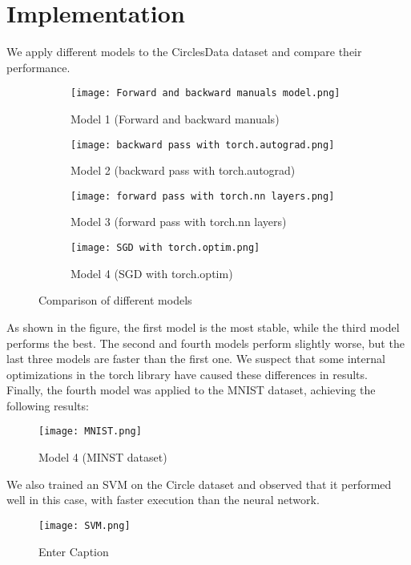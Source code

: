 \documentclass{article}
\begin{document}
\section{Implementation}
We apply different models to the CirclesData dataset and compare their performance.\\
\begin{figure}[H]
    \centering
    \begin{subfigure}{0.45\linewidth}
        \centering
        \texttt{[image: Forward and backward manuals model.png]}
        \caption{Model 1 (Forward and backward manuals)}
        \label{fig:figure1}
    \end{subfigure}
    \begin{subfigure}{0.45\linewidth}
        \centering
        \texttt{[image: backward pass with torch.autograd.png]}
        \caption{Model 2 (backward pass with torch.autograd)}
        \label{fig:figure2}
    \end{subfigure}
    \begin{subfigure}{0.45\linewidth}
        \centering
        \texttt{[image: forward pass with torch.nn layers.png]}
        \caption{Model 3 (forward pass with torch.nn layers)}
        \label{fig:figure3}
    \end{subfigure}
    \begin{subfigure}{0.47\linewidth}
        \centering
        \texttt{[image: SGD with torch.optim.png]}
        \caption{Model 4 (SGD with torch.optim)}
        \label{fig:figure4}
    \end{subfigure}
    \caption{Comparison of different models}
    \label{fig:models_comparison}
\end{figure}
As shown in the figure, the first model is the most stable, while the third model performs the best. The second and fourth models perform slightly worse, but the last three models are faster than the first one. We suspect that some internal optimizations in the torch library have caused these differences in results.\\
Finally, the fourth model was applied to the MNIST dataset, achieving the following results:
\begin{figure}[H]
    \centering
    \texttt{[image: MNIST.png]}
    \caption{Model 4 (MINST dataset)}
    \label{fig:enter-label}
\end{figure}
We also trained an SVM on the Circle dataset and observed that it performed well in this case, with faster execution than the neural network. \\
\begin{figure}[H]
    \centering
    \texttt{[image: SVM.png]}
    \caption{Enter Caption}
    \label{fig:enter-label}
\end{figure}
\end{document}
